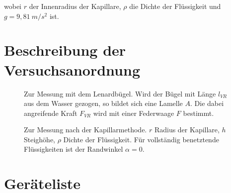 \documentclass{article}
\begin{document}
wobei $r$ der Innenradius der Kapillare, $\rho$ die Dichte der Flüssigkeit und $g = 9,81~m/s^2$ ist.


\newpage
\section{Beschreibung der Versuchsanordnung}

\begin{figure}[h]

\begin{floatrow}
{\caption{Zur Messung mit dem Lenardbügel. Wird der Bügel mit Länge $l_{VR}$ aus dem Wasser gezogen, so bildet sich eine Lamelle $A$. Die dabei angreifende Kraft $F_{VR}$ wird mit einer Federwaage $F$ bestimmt.}
\label{fig:pic1}}

{\caption{Zur Messung nach der Kapillarmethode. $r$ Radius der Kapillare, $h$ Steighöhe, $\rho$ Dichte der Flüssigkeit. Für vollständig benetztende Flüssigkeiten ist der Randwinkel $\alpha=0$.}
\label{fig:pic2}}
\end{floatrow}

\end{figure}



\newpage
\section{Geräteliste}
\end{document}
